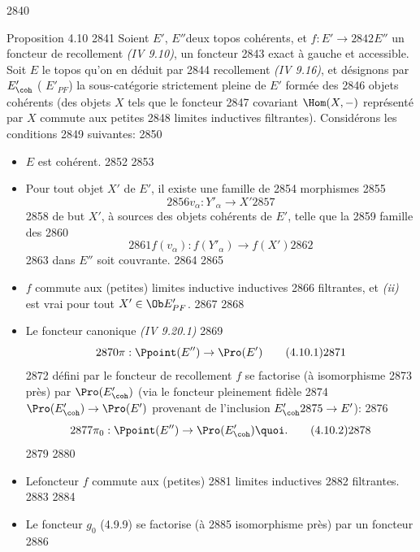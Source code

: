   2840	\begin{enonce*}{Proposition 4.10}
  2841	Soient $E'$, $E''$\pageoriginale deux topos cohérents, et $f : E'\to
  2842	E''$ un foncteur de recollement \emph{(IV 9.10)}, \ie un foncteur
  2843	exact à gauche et accessible. Soit $E$ le topos qu'on en déduit par
  2844	recollement \emph{(IV 9.16)}, et désignons par $E'_{\coh}$ (	$E'_{PF}$) la sous-catégorie strictement pleine de $E'$ formée des
  2846	objets cohérents (\resp des objets $X$ tels que le foncteur
  2847	covariant $\Hom(X, -)$ représenté par $X$ commute aux petites
  2848	limites inductives filtrantes). Considérons les conditions
  2849	suivantes:
  2850	\begin{itemize}
  2851	\item[(i)] $E$ est cohérent.
  2852	
  2853	\item[(ii)] Pour tout objet $X'$ de $E'$, il existe une famille de
  2854	  morphismes
  2855	$$
  2856	v_{\alpha} : Y'_{\alpha} \to X'
  2857	$$
  2858	de but $X'$, à sources des objets cohérents de $E'$, telle que la
  2859	famille des
  2860	$$
  2861	f(v_{\alpha}) : f(Y'_{\alpha}) \to f(X')
  2862	$$
  2863	dans $E''$ soit couvrante.
  2864	
  2865	\item[(ii bis)] $f$ commute aux (petites) limites inductive inductives
  2866	  filtrantes, et \emph{(ii)} est vrai pour tout $X'\in \Ob E'_{PF}$.
  2867	
  2868	\item[(ii ter)] Le foncteur canonique \emph{(IV 9.20.1)}
  2869	\begin{equation*}
  2870	\pi : \Ppoint(E'') \to \Pro(E')\tag{4.10.1}
  2871	\end{equation*}
  2872	défini par le foncteur de recollement $f$ se factorise (à isomorphisme
  2873	près) par $\Pro(E'_{\coh})$ (via le foncteur pleinement fidèle
  2874	$\Pro(E'_{\coh}) \to \Pro(E')$ provenant de l'inclusion $E'_{\coh}
  2875	\to E'$):
  2876	\begin{equation*}
  2877	\pi_0 : \Ppoint (E'') \to \Pro(E'_{\coh}){\quoi}.\tag{4.10.2}
  2878	\end{equation*}
  2879	
  2880	\item[(iii)] Le\pageoriginale foncteur $f$ commute aux (petites)
  2881	  limites inductives
  2882	  filtrantes.
  2883	
  2884	\item[(iii bis)] Le foncteur $g_0$ (4.9.9) se factorise (à
  2885	  isomorphisme près) par un foncteur
  2886	\begin{equation*}

\end{equation*}
\end{itemize}
\end{enonce*}
